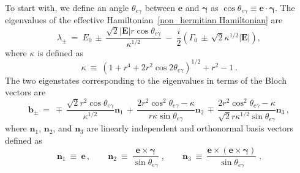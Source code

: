 \documentclass[12pt,a4paper]{article}
\begin{document}
To start with, we define an angle $\theta_{e\gamma}$ between $\mathbf{e}$ and $\boldsymbol{\gamma}$ as $\cos{\theta_{e\gamma}} \equiv \mathbf{e}\cdot\boldsymbol{\gamma}$.
The eigenvalues of the effective Hamiltonian~\eqref{non_hermitian Hamiltonian} are
\begin{equation}
    \lambda_{\pm}\: =\ E_0\,\pm\,\dfrac{\sqrt{2}|\mathbf{E}|r\cos{\theta_{e\gamma}}}{\kappa^{1/2}}\: -\: \frac{i}{2}\left(\Gamma_0\,\pm\,\sqrt{2}\kappa^{1/2}|\mathbf{E}|\right),
\end{equation}
where $\kappa$ is defined as
\begin{equation}
    \kappa \: \equiv\: (1+r^4+2r^2\cos{2\theta_{e\gamma}})^{1/2}+r^2-1\,.
\end{equation}
The two eigenstates corresponding to the eigenvalues in terms of the Bloch vectors are
\begin{equation}
    \mathbf{b}_{\pm}\: =\: \mp\, \dfrac{\sqrt{2}r^2\cos{\theta_{e\gamma}}}{\kappa^{1/2}}\mathbf{n}_1\, +\, \dfrac{2r^2\cos^2{\theta_{e\gamma}}-\kappa}{r\kappa\sin{\theta_{e\gamma}}}\mathbf{n}_2\, \mp\, \dfrac{2r^2\cos^2{\theta_{e\gamma}}-\kappa}{\sqrt{2}r\kappa^{1/2}\sin{\theta_{e\gamma}}}\mathbf{n}_3\,,
\end{equation}
where $\mathbf{n}_1$, $\mathbf{n}_2$, and $\mathbf{n}_3$ are linearly independent and orthonormal basis vectors defined as
\begin{equation}
    \mathbf{n}_1\:\equiv\: \mathbf{e}\,,\qquad \mathbf{n}_2\: \equiv\: \dfrac{\mathbf{e}\times\boldsymbol{\gamma}}{\sin{\theta_{e\gamma}}}\;, \qquad \mathbf{n}_3\: \equiv\: \dfrac{\mathbf{e}\times(\mathbf{e}\times\boldsymbol{\gamma})}{\sin{\theta_{e\gamma}}}\;.
\end{equation}
\end{document}
